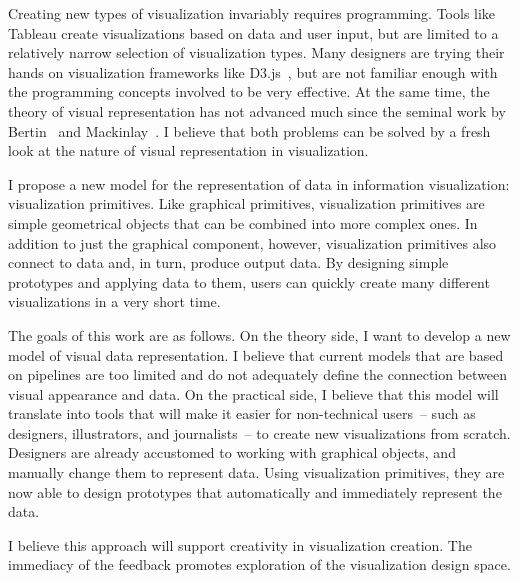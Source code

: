 \label{Intro}

Creating new types of visualization invariably requires programming.
Tools like Tableau create visualizations based on data and user input, but are limited to a relatively narrow selection of visualization types.
Many designers are trying their hands on visualization frameworks like D3.js~\cite{bostock2011d3}, but are not familiar enough with the programming concepts involved to be very effective.
At the same time, the theory of visual representation has not advanced much since the seminal work by Bertin~\cite{bertin1983semiology} and Mackinlay~\cite{Mackinlay1986}.
I believe that both problems can be solved by a fresh look at the nature of visual representation in visualization.

I propose a new model for the representation of data in information visualization: visualization primitives.
Like graphical primitives, visualization primitives are simple geometrical objects that can be combined into more complex ones.
In addition to just the graphical component, however, visualization primitives also connect to data and, in turn, produce output data.
By designing simple prototypes and applying data to them, users can quickly create many different visualizations in a very short time.

The goals of this work are as follows.
On the theory side, I want to develop a new model of visual data representation.
I believe that current models that are based on pipelines are too limited and do not adequately define the connection between visual appearance and data.
On the practical side, I believe that this model will translate into tools that will make it easier for non-technical users~-- such as designers, illustrators, and journalists~-- to create new visualizations from scratch.
Designers are already accustomed to working with graphical objects, and manually change them to represent data.
Using visualization primitives, they are now able to design prototypes that automatically and immediately represent the data.

I believe this approach will support creativity in visualization creation.
The immediacy of the feedback promotes exploration of the visualization design space.
